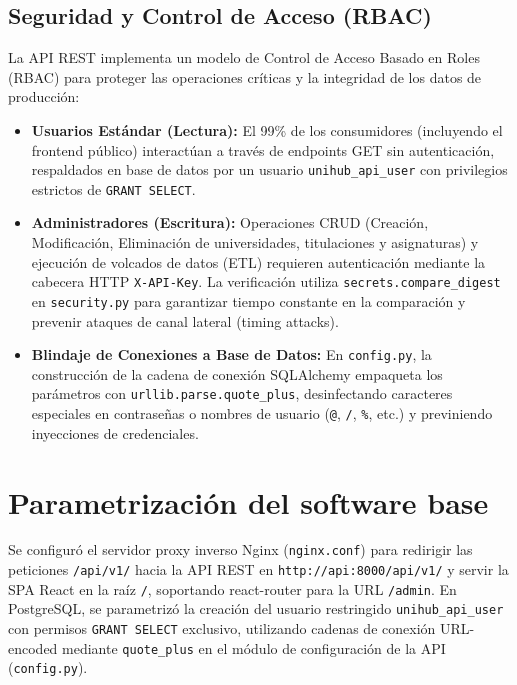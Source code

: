\subsection{Seguridad y Control de Acceso (RBAC)}
La API REST implementa un modelo de Control de Acceso Basado en Roles (RBAC) para proteger las operaciones críticas y la integridad de los datos de producción:
\begin{itemize}
    \item \textbf{Usuarios Estándar (Lectura):} El 99\% de los consumidores (incluyendo el frontend público) interactúan a través de endpoints GET sin autenticación, respaldados en base de datos por un usuario \texttt{unihub\_api\_user} con privilegios estrictos de \texttt{GRANT SELECT}.
    \item \textbf{Administradores (Escritura):} Operaciones CRUD (Creación, Modificación, Eliminación de universidades, titulaciones y asignaturas) y ejecución de volcados de datos (ETL) requieren autenticación mediante la cabecera HTTP \texttt{X-API-Key}. La verificación utiliza \texttt{secrets.compare\_digest} en \texttt{security.py} para garantizar tiempo constante en la comparación y prevenir ataques de canal lateral (timing attacks).
    \item \textbf{Blindaje de Conexiones a Base de Datos:} En \texttt{config.py}, la construcción de la cadena de conexión SQLAlchemy empaqueta los parámetros con \texttt{urllib.parse.quote\_plus}, desinfectando caracteres especiales en contraseñas o nombres de usuario (\texttt{@}, \texttt{/}, \texttt{\%}, etc.) y previniendo inyecciones de credenciales.
\end{itemize}

\section{Parametrización del software base}
Se configuró el servidor proxy inverso Nginx (\texttt{nginx.conf}) para redirigir las peticiones \texttt{/api/v1/} hacia la API REST en \texttt{http://api:8000/api/v1/} y servir la SPA React en la raíz \texttt{/}, soportando react-router para la URL \texttt{/admin}. En PostgreSQL, se parametrizó la creación del usuario restringido \texttt{unihub\_api\_user} con permisos \texttt{GRANT SELECT} exclusivo, utilizando cadenas de conexión URL-encoded mediante \texttt{quote\_plus} en el módulo de configuración de la API (\texttt{config.py}).

